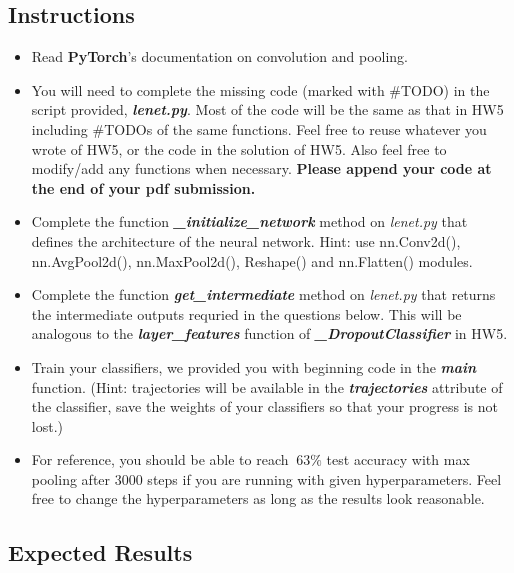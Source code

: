 \documentclass{article}
\begin{document}
\subsection{Instructions}
\begin{itemize}
\item Read \textbf{PyTorch}'s documentation on convolution and pooling.

\item You will need to complete the missing code (marked with \#TODO) in the script provided, \textbf{\textit{lenet.py}}.  Most of the code will be the same as that in HW5 including \#TODOs of the same functions. Feel free to reuse whatever you wrote of HW5, or the code in the solution of HW5. Also feel free to modify/add any functions when necessary. \textbf{Please append your code at the end of your pdf submission.}

\item Complete the function \textbf{\textit{\_initialize\_network}} method on \textit{lenet.py} that defines the architecture of the neural network. Hint: use nn.Conv2d(), nn.AvgPool2d(), nn.MaxPool2d(), Reshape() and nn.Flatten() modules.

\item Complete the function \textbf{\textit{get\_intermediate}} method on \textit{lenet.py} that returns the intermediate outputs requried in the questions below. This will be analogous to the \textbf{\textit{layer\_features}} function of  \textbf{\textit{\_DropoutClassifier}} in HW5.



\item Train your classifiers, we provided you with beginning code in the \textbf{\textit{main}} function. (Hint: trajectories will be available in the \textbf{\textit{trajectories}} attribute of the classifier, save the weights of your classifiers so that your progress is not lost.)

\item For reference, you should be able to reach  $~63\% $ test accuracy with max pooling after $3000$ steps if you are running with given hyperparameters. Feel free to change the hyperparameters as long as the results look reasonable. 

\end{itemize}

\subsection{Expected Results}
\end{document}
